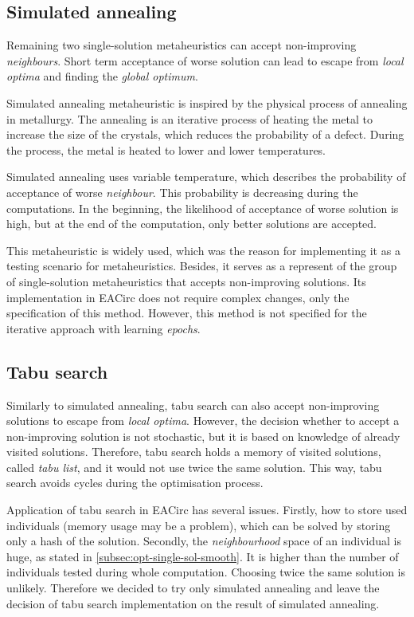 \documentclass[
    digital,    %
    oneside,    %
    color,
    11pt,
    nocover,
    notable,
    nolof,
    nolot,
]{fithesis3}
\begin{document}
\subsection{Simulated annealing}
\label{subsec:opt-single-sol-sa}

Remaining two single-solution metaheuristics can accept non-improving \textit{neighbours}. Short term acceptance of worse solution can lead to escape from \textit{local optima} and finding the \textit{global optimum}.

Simulated annealing metaheuristic is inspired by the physical process of annealing in metallurgy. The annealing is an iterative process of heating the metal to increase the size of the crystals, which reduces the probability of a defect. During the process, the metal is heated to lower and lower temperatures.

Simulated annealing uses variable temperature, which describes the probability of acceptance of worse \textit{neighbour}. This probability is decreasing during the computations. In the beginning, the likelihood of acceptance of worse solution is high, but at the end of the computation, only better solutions are accepted.

This metaheuristic is widely used, which was the reason for implementing it as a testing scenario for metaheuristics. Besides, it serves as a represent of the group of single-solution metaheuristics that accepts non-improving solutions. Its implementation in EACirc does not require complex changes, only the specification of this method. However, this method is not specified for the iterative approach with learning \textit{epochs}.

\subsection{Tabu search}
\label{subsec:opt-single-sol-tabu}

Similarly to simulated annealing, tabu search can also accept non-improving solutions to escape from \textit{local optima}. However, the decision whether to accept a non-improving solution is not stochastic, but it is based on knowledge of already visited solutions. Therefore, tabu search holds a memory of visited solutions, called \textit{tabu list}, and it would not use twice the same solution. This way, tabu search avoids cycles during the optimisation process.

Application of tabu search in EACirc has several issues. Firstly, how to store used individuals (memory usage may be a problem), which can be solved by storing only a hash of the solution. Secondly, the \textit{neighbourhood} space of an individual is huge, as stated in \cref{subsec:opt-single-sol-smooth}. It is higher than the number of individuals tested during whole computation. Choosing twice the same solution is unlikely. Therefore we decided to try only simulated annealing and leave the decision of tabu search implementation on the result of simulated annealing.
\end{document}

